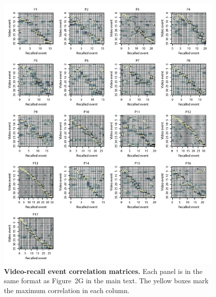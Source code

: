 \documentclass{article}
\begin{document}
\begin{figure}[p!]
\centering
\includegraphics[width=\textwidth]{figs/matchmats}
\caption{\small \textbf{Video-recall event correlation matrices.}  Each panel is in the same format as Figure~2G in the main text.  The yellow boxes mark the maximum correlation in each column.}
\label{fig:matchmats}
\end{figure}
\end{document}
